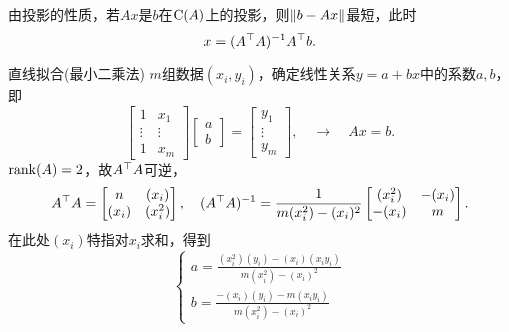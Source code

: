 由投影的性质，若$Ax$是$b$在$\operatorname{C}(A)$上的投影，则$\left\lVert b-Ax\right\rVert$最短，此时
\[
	x=(A^\top A)^{-1} A^\top b.
\]
\begin{method}{直线拟合(最小二乘法)}{}
	$m$组数据$(x_i,y_i)$，确定线性关系$y=a+bx$中的系数$a,b$，即 
	\[
		\begin{bmatrix}
			1&x_1\\\vdots&\vdots\\1&x_m
		\end{bmatrix}
		\begin{bmatrix}
			a\\b
		\end{bmatrix}=
		\begin{bmatrix}
			y_1\\\vdots\\y_m
		\end{bmatrix},\quad\rightarrow\quad Ax=b.
	\]
	$\operatorname{rank}(A)=2$，故$A^\top A$可逆，
	\[
		A^\top A=
		\begin{bmatrix}
			n&(x_i)\\
			(x_i)&(x_i^2)
		\end{bmatrix},\quad
		(A^\top A)^{-1}=\frac1{m(x_i^2)-(x_i)^2}
		\begin{bmatrix}
			(x_i^2)&-(x_i)\\
			-(x_i)&m
		\end{bmatrix}.
	\]
	在此处$(x_i)$特指对$x_i$求和，得到 
	\[
		\begin{cases}
			a=\frac{(x_i^2)(y_i)-(x_i)(x_iy_i)}{m(x_i^2)-(x_i)^2}\\
			b=\frac{-(x_i)(y_i)-m(x_iy_i)}{m(x_i^2)-(x_i)^2}
		\end{cases}
	\]
	\iffalse
	\[
		A\tp A=
		\begin{bmatrix}
			n&\textstyle\sum_{i=1}^n x_i\\
			\textstyle\sum_{i=1}^n x_i&\textstyle\sum_{i=1}^n x_i^2
		\end{bmatrix}
	\]
	则
	\[
		(A\tp A)\iv=\frac1{\textstyle{n\sum_{i=1}^n x_i^2-\bigkh{\sum_{i=1}^n x_i}^2}}
		\begin{bmatrix}
			\textstyle\sum_{i=1}^n x_i^2&-\textstyle\sum_{i=1}^n x_i\\
			-\textstyle\sum_{i=1}^n x_i&n
		\end{bmatrix}
	\]
	得到 
	\[
		\begin{cases}
			a=\frac{\textstyle\sum_{i=1}^n x_i^2\sum_{i=1}^n y_i-\sum_{i=1}^n x_i\sum_{i=1}^n x_iy_i}{\textstyle{n\sum_{i=1}^n x_i^2-\bigkh{\sum_{i=1}^n x_i}^2}}\\[2ex]
			b=\frac{\textstyle-\sum_{i=1}^n x_i\sum_{i=1}^n y_i-n\sum_{i=1}^n x_iy_i}{\textstyle{n\sum_{i=1}^n x_i^2-\bigkh{\sum_{i=1}^n x_i}^2}}
		\end{cases}
	\]
	\fi
\end{method}
